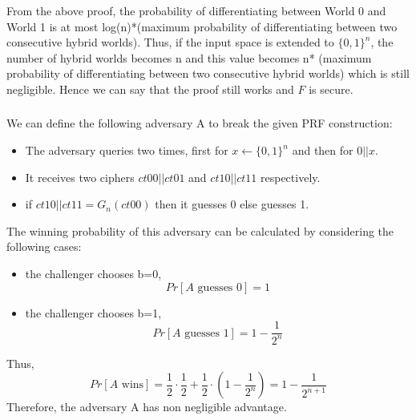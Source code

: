 \documentclass{article}
\begin{document}
\subsubsection{}
From the above proof, the probability of differentiating between World 0 and World 1 is at most log(n)*(maximum probability of differentiating between two consecutive hybrid worlds). Thus, if the input space is extended to $\{0,1\}^{n}$, the number of hybrid worlds becomes n and this value becomes n* (maximum probability of differentiating between two consecutive hybrid worlds) which is still negligible. Hence we can say that the proof still works and $F$ is secure.
\subsubsection{}
We can define the following adversary A to break the given PRF construction:
\begin{itemize}
    \item The adversary queries two times, first for $x\leftarrow\{0,1\}^{n}$ and then for $0||x$.
    \item It receives two ciphers $ct00||ct01$ and $ct10||ct11$ respectively.
    \item if $ct10||ct11=G_{n}(ct00)$ then it guesses 0 else guesses 1.
\end{itemize}
The winning probability of this adversary can be calculated by considering the following cases:
\begin{itemize}
    \item the challenger chooses b=0,
    \[Pr[A\text{ guesses }0]=1\]
    \item the challenger chooses b=1,
    \[Pr[A\text{ guesses }1]=1-\frac{1}{2^{n}}\]
\end{itemize}
Thus,
\[Pr[A\text{ wins}]=\frac{1}{2}\cdot\frac{1}{2}+\frac{1}{2}\cdot(1-\frac{1}{2^{n}})=1-\frac{1}{2^{n+1}}\]
Therefore, the adversary A has non negligible advantage.
\end{document}
